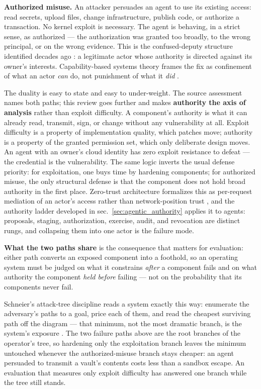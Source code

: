 \documentclass[
  english,
  9pt,
]{extarticle}
\begin{document}
\textbf{Authorized misuse.} An attacker persuades an agent to use its
existing access: read secrets, upload files, change infrastructure,
publish code, or authorize a transaction. No kernel exploit is
necessary. The agent is behaving, in a strict sense, as authorized ---
the authorization was granted too broadly, to the wrong principal, or on
the wrong evidence. This is the confused-deputy structure identified
decades ago \citep{hardy1988}: a legitimate actor whose authority is
directed against its owner's interests. Capability-based systems theory
frames the fix as confinement of what an actor \emph{can} do, not
punishment of what it \emph{did} \citep{levy1984, lampson1974}.

The duality is easy to state and easy to under-weight. The source
assessment names both paths; this review goes further and makes
\textbf{authority the axis of analysis} rather than exploit difficulty.
A component's authority is what it can already read, transmit, sign, or
change without any vulnerability at all. Exploit difficulty is a
property of implementation quality, which patches move; authority is a
property of the granted permission set, which only deliberate design
moves. An agent with an owner's cloud identity has zero exploit
resistance to defeat --- the credential is the vulnerability. The same
logic inverts the usual defense priority: for exploitation, one buys
time by hardening components; for authorized misuse, the only structural
defense is that the component does not hold broad authority in the first
place. Zero-trust architecture formalizes this as per-request mediation
of an actor's access rather than network-position trust
\citep{nist_sp800_207}, and the authority ladder developed in
sec.~\ref{sec:agentic_authority} applies it to agents: proposals,
staging, authorization, exercise, audit, and revocation are distinct
rungs, and collapsing them into one actor is the failure mode.

\textbf{What the two paths share} is the consequence that matters for
evaluation: either path converts an exposed component into a foothold,
so an operating system must be judged on what it constrains \emph{after}
a component fails and on what authority the component \emph{held before}
failing --- not on the probability that its components never fail.

Schneier's attack-tree discipline reads a system exactly this way:
enumerate the adversary's paths to a goal, price each of them, and read
the cheapest surviving path off the diagram --- that minimum, not the
most dramatic branch, is the system's exposure \citep{schneier1999}. The
two failure paths above are the root branches of the operator's tree, so
hardening only the exploitation branch leaves the minimum untouched
whenever the authorized-misuse branch stays cheaper: an agent persuaded
to transmit a vault's contents costs less than a sandbox escape. An
evaluation that measures only exploit difficulty has answered one branch
while the tree still stands.
\end{document}
